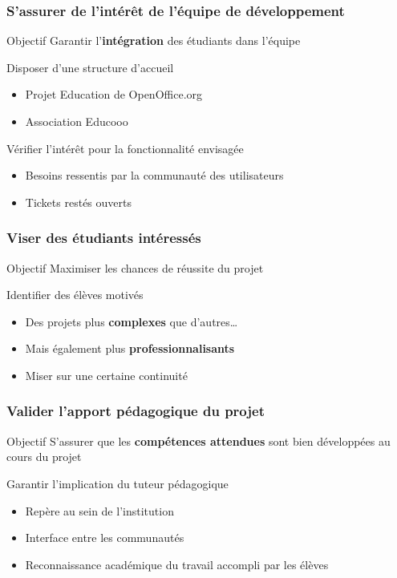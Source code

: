 \documentclass[hyperref,french,usenames,xcolor=dvipsnames]{beamer}
\begin{document}
\frame
{
  \frametitle{S'assurer de l'intérêt de l'équipe de développement}

\begin{alertblock}{Objectif}
Garantir l'\textbf{intégration} des étudiants dans l'équipe 
\end{alertblock}

\begin{block}{Disposer d'une structure d'accueil}
\begin{itemize}
\item Projet Education de OpenOffice.org 
\item Association Educooo
\end{itemize}
\end{block}

\begin{block}{Vérifier l'intérêt pour la fonctionnalité envisagée}
\begin{itemize}
\item Besoins ressentis par la communauté des utilisateurs 
\item Tickets restés ouverts  
\end{itemize}
\end{block}

}

\frame
{
  \frametitle{Viser des étudiants intéressés}

\begin{alertblock}{Objectif}
Maximiser les chances de réussite du projet 
\end{alertblock}

\begin{block}{Identifier des élèves motivés}
\begin{itemize}
\item Des projets plus \textbf{complexes} que d'autres…
\item Mais également plus \textbf{professionnalisants}
\item Miser sur une certaine continuité
\end{itemize}
\end{block}

}

\frame
{
  \frametitle{Valider l'apport pédagogique du projet}

\begin{alertblock}{Objectif}
S'assurer que les \textbf{compétences attendues} sont bien développées au cours du projet
\end{alertblock}

\begin{block}{Garantir l'implication du tuteur pédagogique}
\begin{itemize}
\item Repère au sein de l'institution 
\item Interface entre les communautés 
\item Reconnaissance académique du travail accompli par les élèves
\end{itemize}
\end{block}

}
\end{document}
